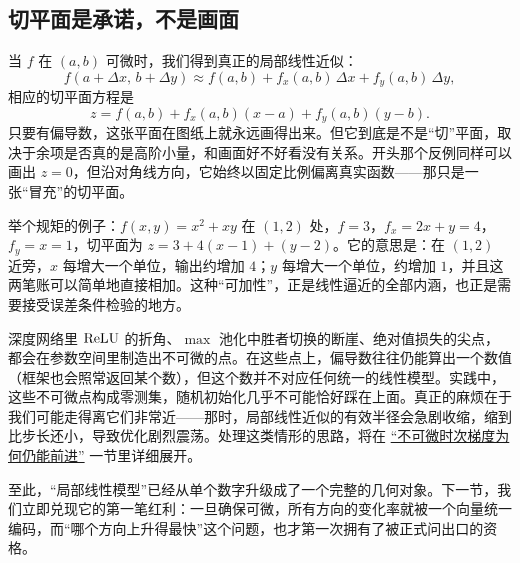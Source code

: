 \subsection{切平面是承诺，不是画面}

当 \(f\) 在 \((a,b)\) 可微时，我们得到真正的局部线性近似：
\[
f(a+\Delta x,\,b+\Delta y)\approx f(a,b)+f_x(a,b)\,\Delta x+f_y(a,b)\,\Delta y,
\]
相应的切平面方程是
\[
z=f(a,b)+f_x(a,b)(x-a)+f_y(a,b)(y-b).
\]
只要有偏导数，这张平面在图纸上就永远画得出来。但它到底是不是``切''平面，取决于余项是否真的是高阶小量，和画面好不好看没有关系。开头那个反例同样可以画出 \(z=0\)，但沿对角线方向，它始终以固定比例偏离真实函数——那只是一张``冒充''的切平面。

举个规矩的例子：\(f(x,y)=x^2+xy\) 在 \((1,2)\) 处，\(f=3\)，\(f_x=2x+y=4\)，\(f_y=x=1\)，切平面为 \(z=3+4(x-1)+(y-2)\)。它的意思是：在 \((1,2)\) 近旁，\(x\) 每增大一个单位，输出约增加 \(4\)；\(y\) 每增大一个单位，约增加 \(1\)，并且这两笔账可以简单地直接相加。这种``可加性''，正是线性逼近的全部内涵，也正是需要接受误差条件检验的地方。

\begin{remark}
深度网络里 \(\operatorname{ReLU}\) 的折角、\(\max\) 池化中胜者切换的断崖、绝对值损失的尖点，都会在参数空间里制造出不可微的点。在这些点上，偏导数往往仍能算出一个数值（框架也会照常返回某个数），但这个数并不对应任何统一的线性模型。实践中，这些不可微点构成零测集，随机初始化几乎不可能恰好踩在上面。真正的麻烦在于我们可能走得离它们非常近——那时，局部线性近似的有效半径会急剧收缩，缩到比步长还小，导致优化剧烈震荡。处理这类情形的思路，将在 \hyperref[sec:09-Convex-Optimization/06-Optimization-Algorithms/03]{``不可微时次梯度为何仍能前进''} 一节里详细展开。
\end{remark}

至此，``局部线性模型''已经从单个数字升级成了一个完整的几何对象。下一节，我们立即兑现它的第一笔红利：一旦确保可微，所有方向的变化率就被一个向量统一编码，而``哪个方向上升得最快''这个问题，也才第一次拥有了被正式问出口的资格。
